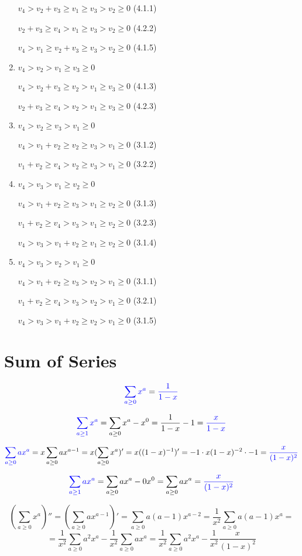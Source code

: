 \documentclass{article}
\begin{document}
\begin{enumerate}
    $v_4>v_2+v_3\geq{v_1}\geq{v_3}>v_2\geq{0}$ (4.1.1)

    $v_2+v_3\geq{v_4}>v_1\geq{v_3}>v_2\geq{0}$ (4.2.2)

    $v_4>v_1\geq{v_2+v_3}\geq{v_3}>v_2\geq{0}$ (4.1.5)

    \item $v_4>v_2>v_1\geq{v_3}\geq{0}$

    $v_4>v_2+v_3\geq{v_2}>v_1\geq{v_3}\geq{0}$ (4.1.3)

    $v_2+v_3\geq{v_4}>v_2>v_1\geq{v_3}\geq{0}$ (4.2.3)

    \item $v_4>v_2\geq{v_3}>v_1\geq{0}$

    $v_4>{v_1+v_2}\geq{v_2}\geq{v_3}>v_1\geq{0}$ (3.1.2)

    $v_1+v_2\geq{v_4}>v_2\geq{v_3}>v_1\geq{0}$ (3.2.2)

    \item $v_4>v_3>v_1\geq{v_2}\geq{0}$

    $v_4>{v_1+v_2}\geq{v_3}>v_1\geq{v_2}\geq{0}$ (3.1.3)

    $v_1+v_2\geq{v_4}>v_3>v_1\geq{v_2}\geq{0}$ (3.2.3)

    $v_4>v_3>v_1+v_2\geq{v_1}\geq{v_2}\geq{0}$ (3.1.4)

    \item $v_4>v_3>v_2>v_1\geq{0}$

    $v_4>v_1+v_2\geq{v_3}>v_2>v_1\geq{0}$ (3.1.1)

    $v_1+v_2\geq{v_4}>v_3>v_2>v_1\geq{0}$ (3.2.1)

    $v_4>v_3>v_1+v_2\geq{v_2}>v_1\geq{0}$ (3.1.5)    
\end{enumerate}
\section{Sum of Series}
\[\textcolor{blue}{\sum_{a\geq{0}}x^a}=\textcolor{blue}{\frac{1}{1-x}}\]

\[\textcolor{blue}{\sum_{a\geq{1}}x^a}=\sum_{a\geq{0}}x^a-x^0=\frac{1}{1-x}-1=\textcolor{blue}{\frac{x}{1-x}}\]

\[\textcolor{blue}{\sum_{a\geq{0}}ax^a}=x\sum_{a\geq{0}}ax^{a-1}=x(\sum_{a\geq{0}}x^a)'=x((1-x)^{-1})'=-1\cdot{x(1-x)^{-2}}\cdot-1=\textcolor{blue}{\frac{x}{(1-x)^2}}\]

\[\textcolor{blue}{\sum_{a\geq{1}}ax^a}=\sum_{a\geq{0}}ax^a-0x^0=\sum_{a\geq{0}}ax^a=\textcolor{blue}{\frac{x}{(1-x)^2}}\]

\[(\sum_{a\geq{0}}x^a)''=(\sum_{a\geq{0}}ax^{a-1})'=\sum_{a\geq{0}}a(a-1)x^{a-2}=\frac{1}{x^2}\sum_{a\geq{0}}a(a-1)x^a=\]\[=\frac{1}{x^2}\sum_{a\geq{0}}a^2x^a-\frac{1}{x^2}\sum_{a\geq{0}}ax^a=\frac{1}{x^2}\sum_{a\geq{0}}a^2x^a-\frac{1}{x^2}\frac{x}{(1-x)^2}\]
\end{document}
